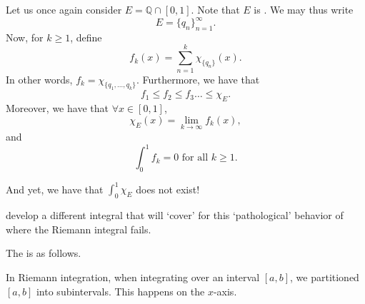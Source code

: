 \documentclass[notoc,notitlepage]{tufte-book}
\begin{document}
\begin{remark}
  Let us once again consider $E = \mathbb{Q} \cap [0, 1]$. Note that $E$ is
   . We
  may thus write
  \begin{equation*}
    E = \{ q_n \}_{n=1}^{\infty}.
  \end{equation*}
  Now, for $k \geq 1$, define
  \begin{equation*}
    f_k(x) = \sum_{n=1}^{k} \chi_{\{q_n\}}(x).
  \end{equation*}
  In other words, $f_k = \chi_{\{q_1, \ldots, q_k\}}$. Furthermore, we have that
  \begin{equation*}
    f_1 \leq f_2 \leq f_3 \hdots \leq \chi_E.
  \end{equation*}
  Moreover, we have that $\forall x \in [0, 1]$,
  \begin{equation*}
    \chi_E(x) = \lim_{k \to \infty} f_k(x),
  \end{equation*}
  and
  \begin{equation*}
    \int_{0}^{1} f_k = 0 \text{ for all } k \geq 1.
  \end{equation*}

  And yet, we have that $\int_{0}^{1} \chi_E$ does not exist!
\end{remark}

 develop a different integral that will `cover' for this
`pathological' behavior of where the Riemann integral fails.

The  is as follows.

In Riemann integration, when integrating over an interval $[a, b]$, we
partitioned $[a, b]$ into subintervals. This happens on the $x$-axis.
\end{document}

